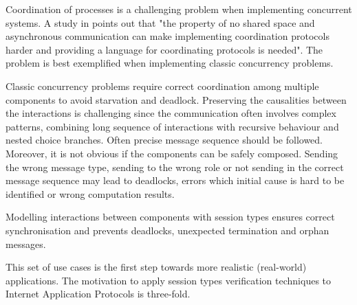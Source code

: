 




 Coordination of processes is a challenging problem when implementing concurrent systems.
A study in \cite{ActorCoordinationStudy} points out that "the property of no shared space and asynchronous
communication can make implementing coordination protocols harder and providing a language
for coordinating protocols is needed". The problem is best exemplified when implementing classic concurrency problems.

Classic concurrency problems require correct coordination among multiple components to avoid starvation and deadlock. Preserving the causalities between the interactions is challenging since the communication often involves complex patterns, combining long sequence of interactions with recursive behaviour and nested choice branches.
Often precise message sequence should be followed. Moreover, it is not obvious if the components can be safely composed. Sending the wrong message type, sending to the wrong role or not sending in the correct message sequence may lead to deadlocks, errors which initial cause is hard to be identified or wrong computation results.


Modelling interactions between components with session types ensures correct synchronisation and prevents deadlocks, unexpected termination and orphan messages.


This set of use cases is the first step towards more realistic (real-world) applications. The motivation to apply session types verification techniques to Internet Application Protocols is three-fold.

